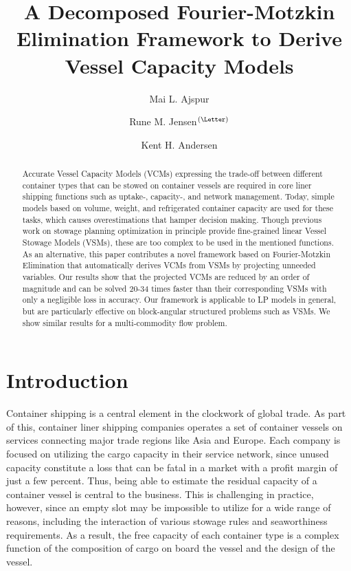 \documentclass{llncs}
\begin{document}
\title{A Decomposed Fourier-Motzkin Elimination Framework to Derive Vessel Capacity Models}
\author{Mai L. Ajspur \and Rune M. Jensen$^{\text{(\Letter)}}$ \and Kent H. Andersen}

\maketitle

\begin{abstract}
Accurate Vessel Capacity Models (VCMs) expressing the trade-off between different container types that can be stowed on container vessels are required in core liner shipping functions such as uptake-, capacity-, and network management. Today, simple models based on volume, weight, and refrigerated container capacity are used for these tasks, which causes overestimations that hamper decision making.
Though previous work on stowage planning optimization in principle provide fine-grained linear Vessel Stowage Models (VSMs), these are too complex to be used in the mentioned functions. As an alternative, this paper contributes a novel framework based on Fourier-Motzkin Elimination that automatically derives VCMs from VSMs by projecting unneeded variables. Our results show that the projected VCMs are reduced by an order of magnitude and can be solved 20-34 times faster than their corresponding VSMs with only a negligible loss in accuracy. 
Our framework is applicable to LP models in general, but are particularly effective on block-angular structured problems such as VSMs. We show similar results for a multi-commodity flow problem.
\end{abstract}
\section{Introduction}
Container shipping is a central element in the clockwork of global trade.
As part of this, container liner shipping companies operates a set of container vessels on services connecting major trade regions like Asia and Europe. Each company is focused on utilizing the cargo capacity in their service network, since unused capacity constitute a loss that can be fatal in a market with a profit margin of just a few percent. Thus, being able to estimate the residual capacity of a container vessel is central to the business. 
This is challenging in practice, however, since an empty slot may be impossible to utilize for a wide range of reasons, including the interaction of various stowage rules and seaworthiness requirements. As a result, the free capacity of each container type is a complex function of the composition of cargo on board the vessel and the design of the vessel. 
\end{document}
